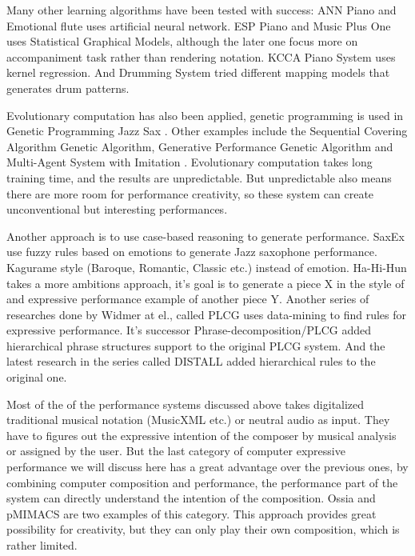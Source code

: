 Many other learning algorithms have been tested with success: ANN Piano \cite{38} and Emotional flute \cite{39} uses artificial neural network. ESP Piano \cite{55} and Music Plus One \cite{52,53,54} uses Statistical Graphical Models, although the later one focus more on accompaniment task rather than rendering notation. KCCA Piano System \cite{57} uses kernel regression. And Drumming System \cite{82} tried different mapping models that generates drum patterns.

Evolutionary computation has also been applied, genetic programming is used in Genetic Programming Jazz Sax \cite{88}. Other examples include the Sequential Covering Algorithm Genetic Algorithm\cite{59}, Generative Performance Genetic Algorithm \cite{89} and Multi-Agent System with Imitation \cite{60, 93}. Evolutionary computation takes long training time, and the results are unpredictable. But unpredictable also means there are more room for performance creativity, so these system can create unconventional but interesting performances.

Another approach is to use case-based reasoning to generate performance. SaxEx\cite{40,41,42} use fuzzy rules based on emotions to generate Jazz saxophone performance. Kagurame \cite{43,44} style (Baroque, Romantic, Classic etc.) instead of emotion. Ha-Hi-Hun \cite{45} takes a more ambitions approach, it's goal is to generate a piece X in the style of and expressive performance example of another piece Y. Another series of researches done by Widmer at el., called PLCG \cite{46, 47, 48} uses data-mining to find rules for expressive performance. It's successor Phrase-decomposition/PLCG \cite{49} added hierarchical phrase structures support to the original PLCG system. And the latest research in the series called DISTALL \cite{50, 51} added hierarchical rules to the original one.

Most of the of the performance systems discussed above takes digitalized traditional musical notation (MusicXML etc.) or neutral audio as input. They have to figures out the expressive intention of the composer by musical analysis or assigned by the user. But the last category of computer expressive performance we will discuss here has a great advantage over the previous ones, by combining computer composition and performance, the performance part of the system can directly understand the intention of the composition. Ossia \cite{61} and pMIMACS \cite{pmimacs} are two examples of this category.
   This approach provides great possibility for creativity, but they can only play their own composition, which is rather limited.

